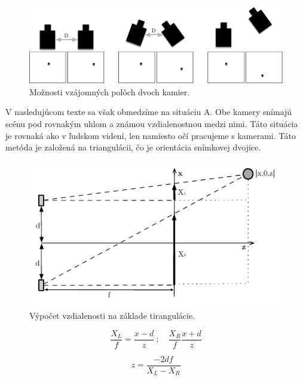 \begin{figure}[H]
\begin{center}
	\includegraphics[scale=0.5]{images/3D_cameraPos}
	\caption{Možnosti vzájomných polôch dvoch kamier.}
	\end{center}
\end{figure}


V nasledujúcom texte sa však obmedzíme na situáciu A. Obe kamery snímajú scénu pod rovnakým uhlom a známou vzdialenostnou medzi nimi. Táto situácia je rovnaká ako v ľudskom videní, len namiesto očí pracujeme s kamerami. Táto metóda je založená na triangulácii, čo je orientácia snímkovej dvojice. \cite{Algorithms_and_Applications} 

\begin{figure}[H]
\begin{center}
	\includegraphics[scale=1.4]{images/stereoscope}
	\caption{Výpočet vzdialenosti na základe tirangulácie.}
	\end{center}
\end{figure}


\begin{figure}[H]
    \centering
    \begin{minipage}[b]{0.49\textwidth}
        \begin{equation}
            \frac{X_L}{f}=\frac{x-d}{z}\ {;}\quad \frac{X_R}{f}\frac{x+d}{z}
        \end{equation}
    \end{minipage}
    \hfill
    \begin{minipage}[b]{0.49\textwidth}
        \begin{equation}
            z=\frac{-2df}{X_L-X_R}
       \end{equation}
    \end{minipage}
\end{figure}



